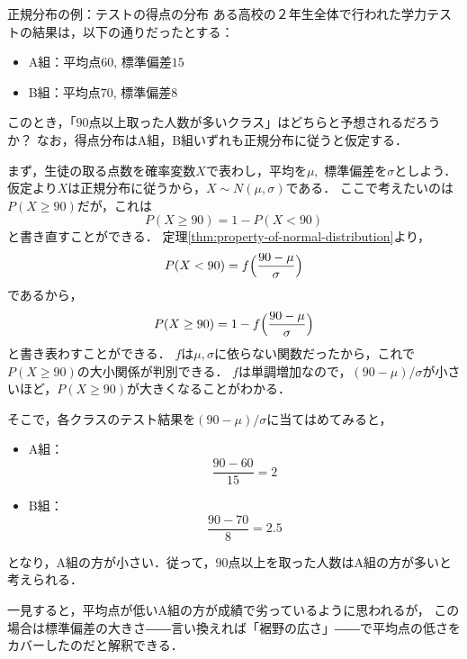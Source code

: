 \documentclass[a5j, uplatex, dvipdfmx]{jsbook}
\newcommand{\bracket}[1]{\Bigl( #1\Bigr)}
\begin{document}
        \begin{ex}{正規分布の例：テストの得点の分布}{}
            ある高校の２年生全体で行われた学力テストの結果は，以下の通りだったとする：
            \begin{itemize}
                \item A組：平均点$60$, 標準偏差$15$
                \item B組：平均点$70$, 標準偏差$8$
            \end{itemize}
            このとき，「$90$点以上取った人数が多いクラス」はどちらと予想されるだろうか？
            なお，得点分布はA組，B組いずれも正規分布に従うと仮定する．

            まず，生徒の取る点数を確率変数$X$で表わし，平均を$\mu,$ 標準偏差を$\sigma$としよう．
            仮定より$X$は正規分布に従うから，$X\sim N(\mu, \sigma)$である．
            ここで考えたいのは$P(X \geq 90)$だが，これは
            \begin{equation*}
                P(X \geq 90) = 1 - P(X < 90)
            \end{equation*}
            と書き直すことができる．
            定理\ref{thm:property-of-normal-distribution}より，
            \begin{equation*}
                P(X < 90) = f\bracket{\frac{90 - \mu}{\sigma}}
            \end{equation*}
            であるから，
            \begin{equation*}
                P(X \geq 90) = 1 - f\bracket{\frac{90 - \mu}{\sigma}}
            \end{equation*}
            と書き表わすことができる．
            $f$は$\mu, \sigma$に依らない関数だったから，これで$P(X \geq 90)$の大小関係が判別できる．
            $f$は単調増加なので，$(90 - \mu)/\sigma$が小さいほど，$P(X \geq 90)$が大きくなることがわかる．

            そこで，各クラスのテスト結果を$(90 - \mu)/\sigma$に当てはめてみると，
            \begin{itemize}
                \item A組：
                \begin{equation*}
                    \frac{90 - 60}{15} = 2
                \end{equation*}
                \item B組：
                \begin{equation*}
                    \frac{90 - 70}{8} = 2.5
                \end{equation*}
            \end{itemize}
            となり，A組の方が小さい．従って，$90$点以上を取った人数はA組の方が多いと考えられる．

            一見すると，平均点が低いA組の方が成績で劣っているように思われるが，
            この場合は標準偏差の大きさ――言い換えれば「裾野の広さ」――で平均点の低さをカバーしたのだと解釈できる．
        \end{ex}
\end{document}
